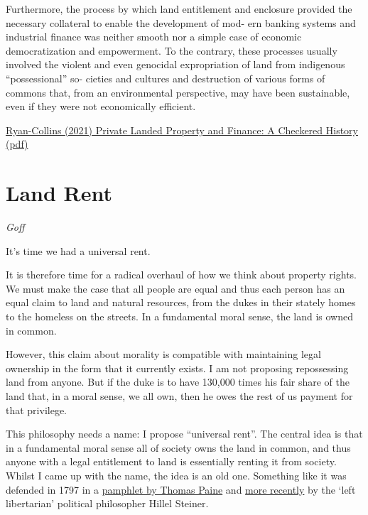 \documentclass[
]{book}
\begin{document}
Furthermore, the process by which land entitlement and enclosure
provided the necessary collateral to enable the development of mod-
ern banking systems and industrial finance was neither smooth nor
a simple case of economic democratization and empowerment. To
the contrary, these processes usually involved the violent and even
genocidal expropriation of land from indigenous ``possessional'' so-
cieties and cultures and destruction of various forms of commons
that, from an environmental perspective, may have been sustainable,
even if they were not economically efficient.

\href{https://onlinelibrary.wi\%20ley.com/doi/10.1111/ajes.12387}{Ryan-Collins (2021) Private Landed Property and Finance: A Checkered History}
\href{pdf/Ryan-Collins_2021_Private_Landed_Property_and_Finance.pdf}{(pdf)}

\hypertarget{land-rent}{%
\section{Land Rent}\label{land-rent}}

\emph{Goff}

It's time we had a universal rent.

It is therefore time for a radical overhaul of how we think about property rights. We must make the case that all people are equal and thus each person has an equal claim to land and natural resources, from the dukes in their stately homes to the homeless on the streets. In a fundamental moral sense, the land is owned in common.

However, this claim about morality is compatible with maintaining legal ownership in the form that it currently exists. I am not proposing repossessing land from anyone. But if the duke is to have 130,000 times his fair share of the land that, in a moral sense, we all own, then he owes the rest of us payment for that privilege.

This philosophy needs a name: I propose ``universal rent''. The central idea is that in a fundamental moral sense all of society owns the land in common, and thus anyone with a legal entitlement to land is essentially renting it from society. Whilst I came up with the name, the idea is an old one. Something like it was defended in 1797 in a \href{https://philpapers.org/rec/VALTOO}{pamphlet by Thomas Paine} and \href{https://onlinelibrary.wiley.com/doi/full/10.1111/j.2050-5876.2016.00877.x}{more recently} by the `left libertarian' political philosopher Hillel Steiner.
\end{document}
